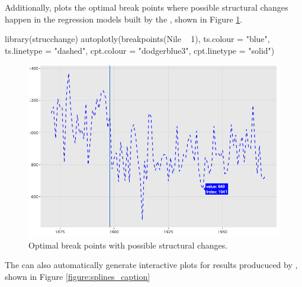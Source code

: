 Additionally,  plots the optimal break points where possible structural changes happen in the regression models built by the , shown in Figure \ref{figure:strucchange_caption}.

\begin{Schunk}
\begin{Sinput}
library(strucchange)
autoplotly(breakpoints(Nile ~ 1), ts.colour = "blue", ts.linetype = "dashed",
           cpt.colour = "dodgerblue3", cpt.linetype = "solid")
\end{Sinput}
\end{Schunk}

\begin{figure}[htbp]
  \centering
  \includegraphics[width=145mm,scale=0.8]{images/strucchange_caption.png}
  \caption{Optimal break points with possible structural changes.}
  \label{figure:strucchange_caption}
\end{figure}


The  can also automatically generate interactive plots for results producuced by , shown in Figure \ref{figure:splines_caption}

\begin{Schunk}
\end{Schunk}

